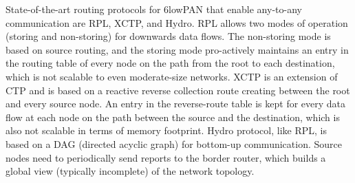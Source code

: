 
State-of-the-art routing protocols for 6lowPAN that enable
any-to-any communication are RPL\cite{rfc6550}, XCTP\cite{xctp}, and
Hydro\cite{hydro}. RPL allows two modes of operation (storing and
non-storing) for downwards data flows. The non-storing mode is based
on source routing, and the storing mode pro-actively maintains an
entry in the routing table of every node on the path from the root
to each destination, which is not scalable to even moderate-size
networks. XCTP is an extension of CTP and is based on a reactive
reverse collection route creating between the root and every source
node. An entry in the reverse-route table is kept for every data
flow at each node on the path between the source and the
destination, which is also not scalable in terms of memory
footprint.
Hydro protocol, like RPL, is based on a DAG
(directed acyclic graph) for bottom-up communication. Source nodes
need to periodically send reports to the border router, which builds
a global view (typically incomplete) of the network topology.



